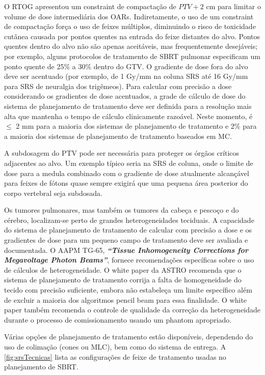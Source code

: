 \documentclass[11pt,a4paper]{article}
\newcounter{exemplo}
\begin{document}
	O RTOG apresentou um constraint de compactação de $PTV + 2 \text{ cm}$ para limitar o volume de dose intermediária dos OARs. Indiretamente, o uso de um constraint de compactação força o uso de feixes múltiplos, diminuindo o risco de toxicidade cutânea causada por pontos quentes na entrada do feixe distantes do alvo. Pontos quentes dentro do alvo não são apenas aceitáveis, mas frequentemente desejáveis; por exemplo, alguns protocolos de tratamento de SBRT pulmonar especificam um ponto quente de 25\% a 30\% dentro do GTV. O gradiente de dose fora do alvo deve ser acentuado (por exemplo, de 1 Gy/mm na coluna SRS até 16 Gy/mm para SRS de neuralgia dos trigêmeos). Para calcular com precisão a dose considerando os gradientes de dose acentuados, a grade de cálculo de dose do sistema de planejamento de tratamento deve ser definida para a resolução mais alta que mantenha o tempo de cálculo clinicamente razoável. Neste momento, é $\leq$ 2 mm para a maioria dos sistemas de planejamento de tratamento e 2\% para a maioria dos sistemas de planejamento de tratamento baseados em MC.

	A subdosagem do PTV pode ser necessária para proteger os órgãos críticos adjacentes ao alvo. Um exemplo típico seria na SRS de coluna, onde o limite de dose para a medula combinado com o gradiente de dose atualmente alcançável para feixes de fótons quase sempre exigirá que uma pequena área posterior do corpo vertebral seja subdosada.

	Os tumores pulmonares, mas também os tumores da cabeça e pescoço e do cérebro, localizam-se perto de grandes heterogeneidades teciduais. A capacidade do sistema de planejamento de tratamento de calcular com precisão a dose e os gradientes de dose para um pequeno campo de tratamento deve ser avaliada e documentada. O AAPM TG-65, \textit{\textbf{``Tissue Inhomogeneity Corrections for Megavoltage Photon Beams''}}\cite{papanikolaou2004tissue}, fornece recomendações específicas sobre o uso de cálculos de heterogeneidade. O white paper da ASTRO recomenda que o sistema de planejamento de tratamento corrija a falta de homogeneidade do tecido com precisão suficiente, embora não estabeleça um limite específico além de excluir a maioria dos algoritmos pencil beam para essa finalidade. O white paper também recomenda o controle de qualidade da correção da heterogeneidade durante o processo de comissionamento usando um phantom apropriado.

	Várias opções de planejamento de tratamento estão disponíveis, dependendo do uso de colimação (cones ou MLC), bem como do sistema de entrega. A \ref{fig:srsTecnicas} lista as configurações de feixe de tratamento usadas no planejamento de SBRT.
\end{document}
